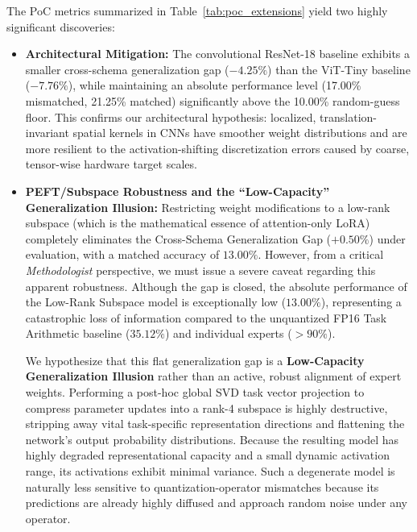 The PoC metrics summarized in Table~\ref{tab:poc_extensions} yield two highly significant discoveries:
\begin{itemize}
    \item \textbf{Architectural Mitigation:} The convolutional ResNet-18 baseline exhibits a smaller cross-schema generalization gap ($-4.25\%$) than the ViT-Tiny baseline ($-7.76\%$), while maintaining an absolute performance level (17.00\% mismatched, 21.25\% matched) significantly above the 10.00\% random-guess floor. This confirms our architectural hypothesis: localized, translation-invariant spatial kernels in CNNs have smoother weight distributions and are more resilient to the activation-shifting discretization errors caused by coarse, tensor-wise hardware target scales.
    \item \textbf{PEFT/Subspace Robustness and the ``Low-Capacity'' Generalization Illusion:} Restricting weight modifications to a low-rank subspace (which is the mathematical essence of attention-only LoRA) completely eliminates the Cross-Schema Generalization Gap ($+0.50\%$) under evaluation, with a matched accuracy of $13.00\%$. However, from a critical \emph{Methodologist} perspective, we must issue a severe caveat regarding this apparent robustness. Although the gap is closed, the absolute performance of the Low-Rank Subspace model is exceptionally low ($13.00\%$), representing a catastrophic loss of information compared to the unquantized FP16 Task Arithmetic baseline ($35.12\%$) and individual experts ($>90\%$). 

    We hypothesize that this flat generalization gap is a \textbf{Low-Capacity Generalization Illusion} rather than an active, robust alignment of expert weights. Performing a post-hoc global SVD task vector projection to compress parameter updates into a rank-4 subspace is highly destructive, stripping away vital task-specific representation directions and flattening the network's output probability distributions. Because the resulting model has highly degraded representational capacity and a small dynamic activation range, its activations exhibit minimal variance. Such a degenerate model is naturally less sensitive to quantization-operator mismatches because its predictions are already highly diffused and approach random noise under any operator. 


\end{itemize}
